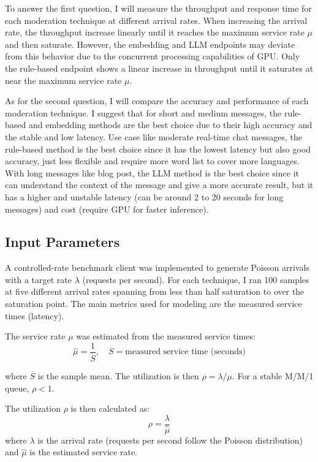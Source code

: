 \documentclass[
	english,
	accentcolor=9c,
	type=intern,
	marginpar=false,
	11pt
]{tudapub}
\begin{document}
To answer the first question, I will measure the throughput and response time for each moderation technique at different arrival rates.
When increasing the arrival rate, the throughput increase linearly until it reaches the maximum service rate \(\mu\) and then saturate.
However, the embedding and LLM endpoints may deviate from this behavior due to the concurrent processing capabilities of GPU.
Only the rule-based endpoint shows a linear increase in throughput until it saturates at near the maximum service rate \(\mu\).

As for the second question, I will compare the accuracy and performance of each moderation technique.
I suggest that for short and medium messages, the rule-based and embedding methods are the best choice due to their high accuracy and the stable and low latency.
Use case like moderate real-time chat messages, the rule-based method is the best choice since it has the lowest latency but also good accuracy, just less flexible and require more word list to cover more languages.
With long messages like blog post, the LLM method is the best choice since it can understand the context of the message and give a more accurate result, but it has a higher and unstable latency (can be around 2 to 20 seconds for long messages) and cost (require GPU for faster inference).

\subsection{Input Parameters}

A controlled-rate benchmark client was implemented to generate Poisson arrivals with a target rate \(\lambda\) (requests per second).
For each technique, I ran 100 samples at five different arrival rates spanning from less than half saturation to over the saturation point.
The main metrics used for modeling are the measured service times (latency).

The service rate \(\mu\) was estimated from the measured service times:
\[
    \hat{\mu} = \frac{1}{\overline{S}}, \quad S = \text{measured service time (seconds)}
\]

where \(\overline{S}\) is the sample mean. The utilization is then \(\rho = \lambda / \mu\). For a stable M/M/1 queue, \(\rho < 1\).

The utilization \(\rho\) is then calculated as:
\[
    \rho = \frac{\lambda}{\hat{\mu}}
\]
where \(\lambda\) is the arrival rate (requests per second follow the Poisson distribution) and \(\hat{\mu}\) is the estimated service rate.
\end{document}
